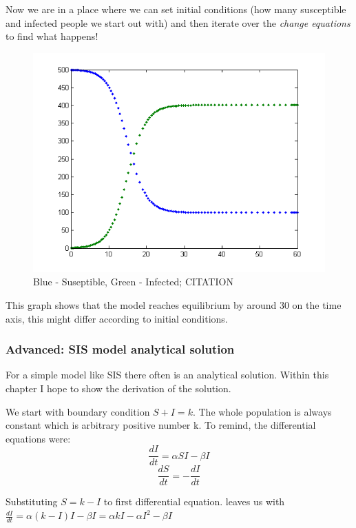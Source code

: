 \documentclass[pdftex, 12pt, a4paper]{report}
\begin{document}
	Now we are in a place where we can set initial conditions (how many susceptible and infected people we start out with) and then iterate over the \textit{change equations} to find what happens!	

	\begin{figure}[H]
		\centering
		\includegraphics[scale=0.7]{SISeq}
		\caption{Blue - Suseptible, Green - Infected; CITATION}
	\end{figure}
	
	This graph shows that the model reaches equilibrium by around 30 on the time axis, this might differ according to initial conditions.
	
	\subsubsection{Advanced: SIS model analytical solution}
	
	For a simple model like SIS there often is an analytical solution. Within this chapter I hope to show the derivation of the solution.
	
	We start with boundary condition $S + I = k$. The whole population is always constant which is arbitrary positive number k. To remind, the differential equations were: $$\frac{dI}{dt} = \alpha S I - \beta I $$ $$ \frac{dS}{dt} = -\frac{dI}{dt}$$
	
	Substituting $S = k - I$ to first differential equation. leaves us with $\frac{dI}{dt} = \alpha (k - I) I - \beta I = \alpha k I - \alpha I^2 - \beta I$
	
\end{document}
